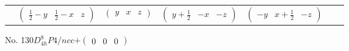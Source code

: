 \documentclass[fleqn,9pt,landscape]{jsarticle}
\begin{document}
\begin{center}
\begin{longtable}{ccccccc}
& $ \begin{pmatrix} \frac{1}{2} - y & \frac{1}{2} - x & z \end{pmatrix} $ & $ \begin{pmatrix} y & x & z \end{pmatrix} $ & $ \begin{pmatrix} y + \frac{1}{2} & - x & - z \end{pmatrix} $ & $ \begin{pmatrix} - y & x + \frac{1}{2} & - z \end{pmatrix} $ & $  $ & $  $ \\
\end{longtable}
\end{center}
\newpage
No. 130\quad$D_{4h}^{8}$\quad$P4/ncc$\quad[ tetragonal ]\quad$+\begin{pmatrix} 0 & 0 & 0 \end{pmatrix}$
\end{document}
